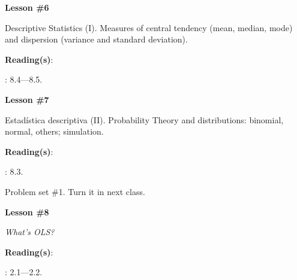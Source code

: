 \documentclass[letterpaper]{article}
\renewenvironment{itemize}{
  \begin{list}{}{
    \setlength{\leftmargin}{1.5em}
  }
}{
  \end{list}
}
\begin{document}
\begin{enumerate}
	\item {}

			\begin{itemize} 
				\item[$\bullet$] {\bf Lesson \#6}
					\begin{itemize} 
				\item[$\circ$] Descriptive Statistics (I). Measures of central tendency (mean, median, mode) and dispersion (variance and standard deviation). %
          \item[$\circ$] {\bf Reading(s)}: 
          \begin{itemize}
            \item[$\diamond$] \textcite{Gill:2006wp}: 8.4---8.5.
          \end{itemize}
					\end{itemize}
			\end{itemize}


			\begin{itemize} 
				\item[$\bullet$] {\bf Lesson \#7}
					\begin{itemize} 
				\item[$\circ$] Estad\'istica descriptiva (II). Probability Theory and distributions: binomial, normal, others; simulation. %
         \item[$\circ$] {\bf Reading(s)}: 
          \begin{itemize}
            \item[$\diamond$] \textcite{Gill:2006wp}: 8.3.
          \end{itemize}
					\end{itemize}
			\end{itemize}


\item[{\color{red}\Pointinghand}] Problem set \#1. Turn it in next class.


	\item {}


			\begin{itemize} 
				\item[$\bullet$] {\bf Lesson \#8}
					\begin{itemize} 
						\item[$\circ$] \emph{What's OLS?}
						\item[$\circ$] {\bf Reading(s)}: 
							\begin{itemize}
								\item[$\diamond$] \textcite{Wooldridge2002}: 2.1---2.2.
							\end{itemize}
					\end{itemize}
			\end{itemize}




\end{enumerate}
\end{document}
